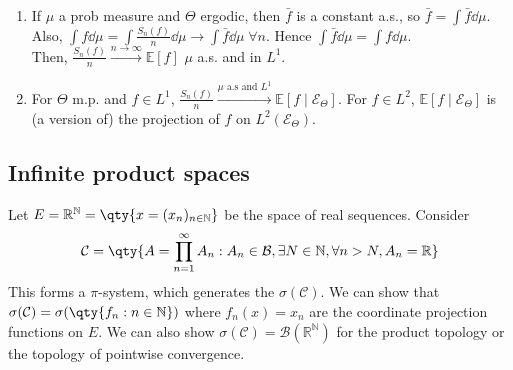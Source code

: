 \begin{remark} \label{rem:ergodic} \
	\begin{enumerate}
		\item If $\mu$ a prob measure and $\Theta$ ergodic, then $\bar f$ is a constant a.s., so $\bar f = \int \bar f \dd{\mu}$.
		Also, $\int f \dd{\mu} = \int \frac{S_n(f)}{n} \dd{\mu} \to \int \bar f \dd{\mu} \; \forall n$.
		Hence $\int \bar f \dd{\mu} = \int f \dd{\mu}$. \\
		Then, $\frac{S_n(f)}{n} \xrightarrow{n \to \infty} \mathbb{E}[f]$ $\mu$ a.s. and in $L^1$.
		\item For $\Theta$ m.p. and $f \in L^1$, $\frac{S_n(f)}{n} \xrightarrow{\mu \text{ a.s and } L^1} \mathbb{E}[f \mid \mathcal{E}_\Theta]$.
		For $f \in L^2$, $\mathbb{E}[f \mid \mathcal{E}_\Theta]$ is (a version of) the projection of $f$ on $L^2(\mathcal{E}_\Theta)$.
	\end{enumerate}
\end{remark}

\subsection{Infinite product spaces}
Let $E = \mathbb R^{\mathbb N} = \qty{x = (x_n)_{n \in \mathbb N}}$ be the space of real sequences.
Consider
\begin{align*}
        \mathcal C = \qty{A = \prod_{n=1}^\infty A_n : A_n \in \mathcal B, \exists N \in \mathbb N, \forall n > N, A_n = \mathbb R}
    \end{align*}
This forms a $\pi$-system, which generates the  $\sigma(\mathcal C)$.
We can show that $\sigma(\mathcal C) = \sigma(\qty{f_n : n \in \mathbb N})$ where $f_n(x) = x_n$ are the coordinate projection functions on $E$.
We can also show $\sigma(\mathcal C) = \mathcal B(\mathbb R^{\mathbb N})$ for the product topology or the topology of pointwise convergence.


